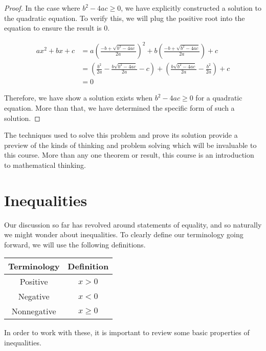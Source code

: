 \documentclass{report}
\begin{document}
\begin{proof}
	In the case where $b^2 - 4ac \ge 0$, we have explicitly constructed a solution to the quadratic equation. To verify this, we will plug the positive root into the equation to ensure the result is 0.
	
	\begin{align*}
		ax^2 + bx + c
		&= a \left( \frac{-b + \sqrt{b^2 - 4ac}}{2a} \right)^2 + b \left( \frac{-b + \sqrt{b^2 - 4ac}}{2a} \right) + c \\
		&= \left( \frac{b^2}{2a} - \frac{b\sqrt{b^2 - 4ac}}{2a} - c\right) + \left( \frac{b\sqrt{b^2 - 4ac}}{2a} - \frac{b^2}{2a}\right) + c \\
		&= 0
	\end{align*}
	
	Therefore, we have show a solution exists when  $b^2 - 4ac \ge 0$ for a quadratic equation. More than that, we have determined the specific form of such a solution.
\end{proof}
\vspace{\baselineskip}

The techniques used to solve this problem and prove its solution provide a preview of the kinds of thinking and problem solving which will be invaluable to this course. More than any one theorem or result, this course is an introduction to mathematical thinking.

\section{Inequalities}
Our discussion so far has revolved around statements of equality, and so naturally we might wonder about inequalities. To clearly define our terminology going forward, we will use the following definitions.

\vspace{\baselineskip}
\begin{center}
	\begin{tabular}{cc}
		\toprule
		Terminology & Definition \\
		\midrule
		Positive & $x > 0$ \\
		Negative & $x < 0$ \\
		Nonnegative & $x \ge 0$ \\
		\bottomrule
	\end{tabular}
\end{center}
\vspace{\baselineskip}


In order to work with these, it is important to review some basic properties of inequalities.
\end{document}
